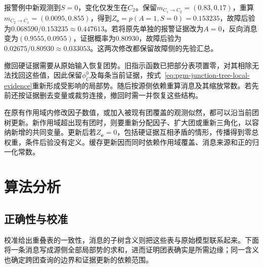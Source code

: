 报警例中新观测到$S=0$，变化仅发生在$C_2$。保留$m_{C_1\to C_2}=(0.83,0.17)$，重算$m_{C_2\to C_1}=(0.0095,0.855)$，得到$Z_{\bm e}=p(A=1,S=0)=0.153235$，故障后验为$0.068590/0.153235\approx0.447613$。若将原先单独的报警证据改为$A=0$，反向消息变为$(0.9555,0.0955)$，证据概率为$0.80930$，故障后验为$0.02675/0.80930\approx0.033053$。这两次修改都保留故障侧的先验汇总。

撤回硬证据需要从原始输入恢复团势。旧指示函数已把部分表项置零，对其相除无法找回这些值，因此保留$\phi_C^0$及每条当前证据，按式~\eqref{eq:pgm-junction-tree-local-evidence}重新形成受影响的局部势。随后按源侧依赖重算消息及其缩放常数。若先前还按证据删去变量或裁剪连接，撤回时需一并恢复这些结构。

在原有作用域内修改因子数值，或加入被现有团覆盖的观测似然，都可以沿当前团树更新。新作用域超出现有团时，则要重新分配因子、扩大团或重新三角化，以容纳新增的共同变量。更新后若$Z_{\bm e}=0$，包括硬证据互相矛盾的情形，传播得到零总权重，条件后验没有定义。缓存更新因而同时依赖作用域覆盖、消息来源和正的归一化常数。

\section{算法分析}
\label{sec:pgm-junction-tree-analysis}

\subsection{正确性与校准}
\label{sec:pgm-junction-tree-correctness}

校准给出重叠表的一致性，消息的子树含义则把这些表与原始模型联系起来。下面将一条消息写成源侧全部局部势的求和，进而证明团表确实是所需边缘；同一含义也确定跨团查询的边界和证据更新的依赖范围。

